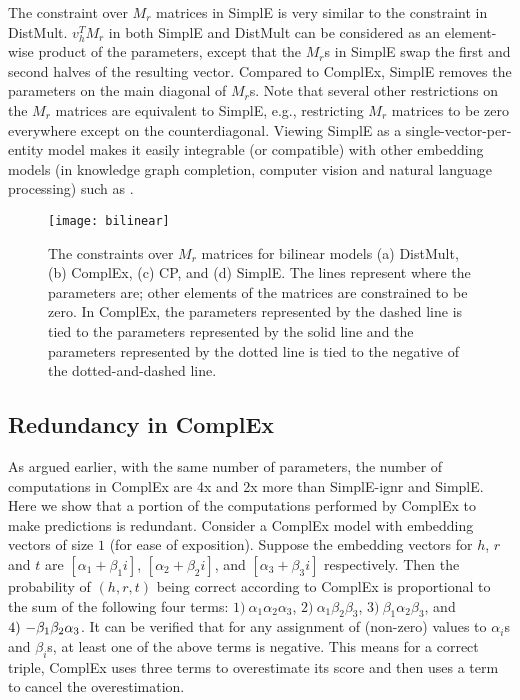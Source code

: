 \documentclass{article}
\newcommand{\triple}[3]{(\mathit{#1}, \mathit{#2}, \mathit{#3})}
\begin{document}
The constraint over $M_r$ matrices in SimplE is very similar to the constraint in DistMult. $v_h^TM_r$ in both SimplE and DistMult can be considered as an element-wise product of the parameters, except that the $M_r$s in SimplE swap the first and second halves of the resulting vector.  
Compared to ComplEx, SimplE removes the parameters on the main diagonal of $M_r$s. Note that several other restrictions on the $M_r$ matrices are equivalent to SimplE, e.g., restricting $M_r$ matrices to be zero everywhere except on the counterdiagonal. Viewing SimplE as a single-vector-per-entity model makes it easily integrable (or compatible) with other embedding models (in knowledge graph completion, computer vision and natural language processing) such as \cite{santoro2017simple,zhang2017visual,schlichtkrull2018modeling}.

\begin{figure}[t]
\centering
\texttt{[image: bilinear]}
\caption{The constraints over $M_r$ matrices for bilinear models (a) DistMult, (b) ComplEx, (c) CP, and (d) SimplE. The lines represent where the parameters are; other elements of the matrices are constrained to be zero. In ComplEx, the parameters represented by the dashed line is tied to the parameters represented by the solid line and the parameters represented by the dotted line is tied to the negative of the dotted-and-dashed line.}
\label{bilinear-fig}
\end{figure}

\subsection{Redundancy in ComplEx}
As argued earlier, with the same number of parameters, the number of computations in ComplEx are 4x and 2x more than SimplE-ignr and SimplE. Here we show that a portion of the computations performed by ComplEx to make predictions is redundant. Consider a ComplEx model with embedding vectors of size $1$ (for ease of exposition). Suppose the embedding vectors for $h$, $r$ and $t$ are $[\alpha_1 + \beta_1i]$, $[\alpha_2 + \beta_2i]$, and $[\alpha_3 + \beta_3i]$ respectively. Then the probability of $\triple{h}{r}{t}$ being correct according to ComplEx is proportional to the sum of the following four terms: $1)~\alpha_1\alpha_2\alpha_3$, $2)~\alpha_1\beta_2\beta_3$, $3)~\beta_1\alpha_2\beta_3$, and $4)~\mathnormal{-}\beta_1\beta_2\alpha_3$.
It can be verified that for any assignment of (non-zero) values to $\alpha_i$s and $\beta_i$s, at least one of the above terms is negative. 
This means for a correct triple, ComplEx uses three terms to overestimate its score and then uses a term to cancel the overestimation.
\end{document}

